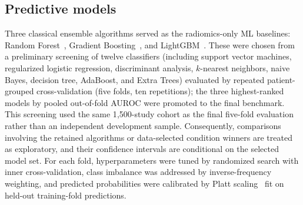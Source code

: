 \documentclass[11pt]{article}
\begin{document}
\subsection{Predictive models}
\label{sec:models}

Three classical ensemble algorithms served as the radiomics-only ML baselines:
Random Forest~\citep{breiman2001random}, Gradient
Boosting~\citep{friedman2001greedy}, and LightGBM~\citep{ke2017lightgbm}. These
were chosen from a preliminary screening of twelve classifiers (including
support vector machines, regularized logistic regression, discriminant analysis,
$k$-nearest neighbors, naive Bayes, decision tree, AdaBoost, and Extra Trees)
evaluated by repeated patient-grouped cross-validation (five folds, ten
repetitions); the three highest-ranked models by pooled out-of-fold AUROC were
promoted to the final benchmark. This screening used the same 1{,}500-study
cohort as the final five-fold evaluation rather than an independent development
sample. Consequently, comparisons involving the retained algorithms or
data-selected condition winners are treated as exploratory, and their confidence
intervals are conditional on the selected model set. For each fold,
hyperparameters were tuned by
randomized search with inner cross-validation, class imbalance was addressed by
inverse-frequency weighting, and predicted probabilities were calibrated by
Platt scaling~\citep{platt1999probabilistic} fit on held-out training-fold
predictions.
\end{document}
